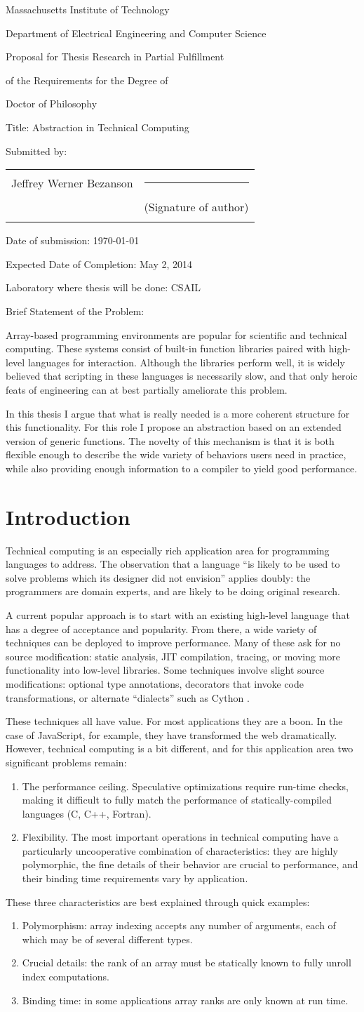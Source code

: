 \documentclass[12pt]{article}
\author & \signatureline \\
\def\author{Jeffrey Werner Bezanson}
\def\addressone{}
\def\addresstwo{}
\def\title{Abstraction in Technical Computing}
\def\expectedcompletetiondate{May 2, 2014}
\def\briefproblemstatement{

Array-based programming environments are popular for scientific and
technical computing.
These systems consist of built-in function libraries paired with high-level
languages for interaction.
Although the libraries perform well, it is widely believed that scripting in these
languages is necessarily slow, and that only heroic feats of engineering can at
best partially ameliorate this problem.

In this thesis I argue that what is really needed is a more coherent
structure for this functionality. For this role I propose an abstraction
based on an extended version of generic functions. The novelty of this
mechanism is that it is both flexible enough to describe the wide
variety of behaviors users need in practice, while also providing
enough information to a compiler to yield good performance.
















}
\def\signatureline{\rule{2.5in}{0.25pt}}
\def\thesisproposalform{
\begin{center}
Massachusetts Institute of Technology

Department of Electrical Engineering and Computer Science

\bigskip

Proposal for Thesis Research in Partial Fulfillment

of the Requirements for the Degree of 

Doctor of Philosophy
\end{center}

\bigskip

Title:  \title

Submitted by: \hfill
\begin{tabular}[t]{p{0.3\textwidth}p{0.4\textwidth}}
\author & \signatureline \\
\addressone & (Signature of author) \\
\addresstwo \\
\end{tabular}

Date of submission:  \today

Expected Date of Completion:  \expectedcompletetiondate

Laboratory where thesis will be done: CSAIL

Brief Statement of the Problem:

\briefproblemstatement 

 \newpage }
\begin{document}
\thesisproposalform

\newpage

\section{Introduction}

Technical computing is an especially rich application area for programming
languages to address. The observation that a language ``is likely to be used to
solve problems which its designer did not envision'' \cite{Liskov:1974pb}
applies doubly: the programmers are domain experts, and are likely to be
doing original research.

A current popular approach is to start with an existing high-level language
that has a degree of acceptance and popularity. From there, a wide variety
of techniques can be deployed to improve performance. Many of these ask for
no source modification: static analysis, JIT compilation, tracing, or
moving more functionality into low-level libraries. Some techniques involve
slight source modifications: optional type annotations, decorators that
invoke code transformations, or alternate ``dialects'' such as Cython
\cite{Behnel:2011}.

These techniques all have value. For most applications they are a boon.
In the case of JavaScript, for example, they have transformed the web
dramatically. However, technical computing is a bit different, and for
this application area two significant problems remain:

\begin{enumerate}
\item The performance ceiling. Speculative optimizations require
run-time checks, making it difficult to fully match the performance of
statically-compiled languages (C, C++, Fortran).

\item Flexibility. The most important operations in technical computing
have a particularly uncooperative combination of characteristics:
they are highly polymorphic, the fine details of their behavior are
crucial to performance, and their binding time requirements
vary by application.
\end{enumerate}

These three characteristics are best explained through quick examples:

\begin{enumerate}
\item Polymorphism: array indexing accepts any number of arguments, each of
which may be of several different types.

\item Crucial details: the rank of an array must be statically known to fully
unroll index computations.

\item Binding time: in some applications array ranks are only known at run
time.
\end{enumerate}
\end{document}
